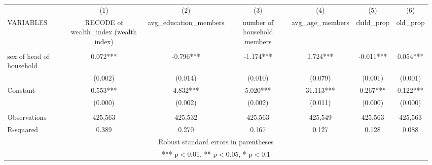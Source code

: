 \documentclass[]{article}
\begin{document}
\begin{tabular}{lcccccc} \hline
 & (1) & (2) & (3) & (4) & (5) & (6) \\
VARIABLES & RECODE of wealth\_index (wealth index) & avg\_education\_members & number of household members & avg\_age\_members & child\_prop & old\_prop \\ \hline
 &  &  &  &  &  &  \\
sex of head of household & 0.072*** & -0.796*** & -1.174*** & 1.724*** & -0.011*** & 0.054*** \\
 & (0.002) & (0.014) & (0.010) & (0.079) & (0.001) & (0.001) \\
Constant & 0.553*** & 4.832*** & 5.020*** & 31.113*** & 0.267*** & 0.122*** \\
 & (0.000) & (0.002) & (0.002) & (0.011) & (0.000) & (0.000) \\
 &  &  &  &  &  &  \\
Observations & 425,563 & 425,532 & 425,563 & 425,549 & 425,563 & 425,563 \\
 R-squared & 0.389 & 0.270 & 0.167 & 0.127 & 0.128 & 0.088 \\ \hline
\multicolumn{7}{c}{ Robust standard errors in parentheses} \\
\multicolumn{7}{c}{ *** p$<$0.01, ** p$<$0.05, * p$<$0.1} \\
\end{tabular}
\end{document}
